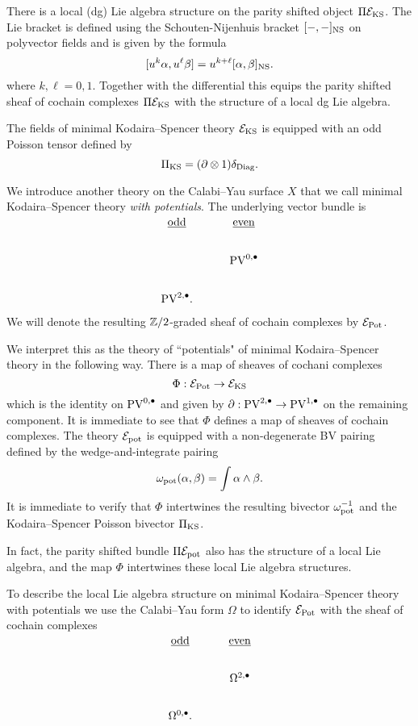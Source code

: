 \documentclass[11pt]{amsart}
\def\PV{{\rm PV}}
\begin{document}
There is a local (dg) Lie algebra structure on the parity shifted object $\Pi \mathcal E_{\rm KS}$.
The Lie bracket is defined using the Schouten-Nijenhuis bracket $[-,-]_{\rm NS}$ on polyvector fields and is given by the formula
\[
[u^k \alpha , u^\ell \beta] = u^{k+\ell} [\alpha, \beta]_{\rm NS} .
\]
where $k, \ell = 0,1$.
Together with the differential this equips the parity shifted sheaf of cochain complexes $\Pi \mathcal E_{\rm KS}$ with the structure of a local dg Lie algebra.

The fields of minimal Kodaira--Spencer theory $\mathcal E_{\rm KS}$ is equipped with an odd Poisson tensor defined by
\[
\Pi_{\rm KS} = (\partial \otimes 1) \delta_{\rm Diag} .
\]

We introduce another theory on the Calabi--Yau surface $X$ that we call minimal Kodaira--Spencer theory {\em with potentials}.
The underlying vector bundle is
\[
\begin{tikzcd}
\ul{\rm odd} & \ul{\rm even} \\
 & \PV^{0,\bu} \\
 \PV^{2,\bu}  .
\end{tikzcd}
\]
We will denote the resulting $\mathbb Z /2$-graded sheaf of cochain complexes by $\mathcal E_{\rm Pot}$.

We interpret this as the theory of  ``potentials"  of minimal Kodaira--Spencer theory in the following way.
There is a map of sheaves of cochani complexes
\[
\Phi : \mathcal E_{\rm Pot} \to \mathcal E_{\rm KS}
\]
which is the identity on $\PV^{0,\bu}$ and given by $\partial : \PV^{2,\bu} \to \PV^{1,\bu}$ on the remaining component.
It is immediate to see that $\Phi$ defines a map of sheaves of cochain complexes.
The theory $\mathcal E_{\rm pot}$ is equipped with a non-degenerate BV pairing defined by the wedge-and-integrate pairing
\[
\omega_{\rm pot} (\alpha, \beta) = \int \alpha \wedge \beta  .
\]
It is immediate to verify that $\Phi$ intertwines the resulting bivector $\omega_{\rm pot}^{-1}$ and the Kodaira--Spencer Poisson bivector $\Pi_{\rm KS}$.

In fact, the parity shifted bundle $\Pi \mathcal E_{\rm pot}$ also has the structure of a local Lie algebra, and the map $\Phi$ intertwines these local Lie algebra structures.

To describe the local Lie algebra structure on minimal Kodaira--Spencer theory with potentials we use the Calabi--Yau form $\Omega$ to identify $\mathcal E_{\rm Pot}$ with the sheaf of cochain complexes
\[
\begin{tikzcd}
\ul{\rm odd} & \ul{\rm even} \\
 & \Omega^{2,\bu} \\
 \Omega^{0,\bu}  .
\end{tikzcd}
\]
\end{document}
